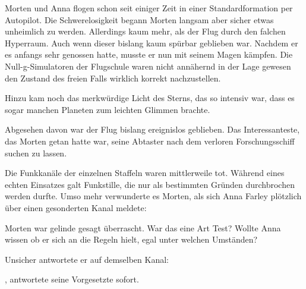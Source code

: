 Morten und Anna flogen schon seit einiger Zeit in einer Standardformation per Autopilot. Die Schwerelosigkeit begann Morten langsam aber sicher etwas unheimlich zu werden. Allerdings kaum mehr, als der Flug durch den falchen Hyperraum. Auch wenn dieser bislang kaum spürbar geblieben war. Nachdem er es anfangs sehr genossen hatte, musste er nun mit seinem Magen kämpfen. Die Null-g-Simulatoren der Flugschule waren nicht annähernd in der Lage gewesen den Zustand des freien Falls wirklich korrekt nachzustellen.

\par

Hinzu kam noch das merkwürdige Licht des Sterns, das so intensiv war, dass es sogar manchen Planeten zum leichten Glimmen brachte.

\par

Abgesehen davon war der Flug bislang ereignislos geblieben. Das Interessanteste, das Morten getan hatte war, seine Abtaster nach dem verloren Forschungsschiff suchen zu lassen.

\par

Die Funkkanäle der einzelnen Staffeln waren mittlerweile tot. Während eines echten Einsatzes galt Funkstille, die nur als bestimmten Gründen durchbrochen werden durfte. Umso mehr verwunderte es Morten, als sich Anna Farley plötzlich über einen gesonderten Kanal meldete: 

\par

Morten war gelinde gesagt überrascht. War das eine Art Test? Wollte Anna wissen ob er sich an die Regeln hielt, egal unter welchen Umständen?

\par

Unsicher antwortete er auf demselben Kanal: 

\par

, antwortete seine Vorgesetzte sofort. 

\par

